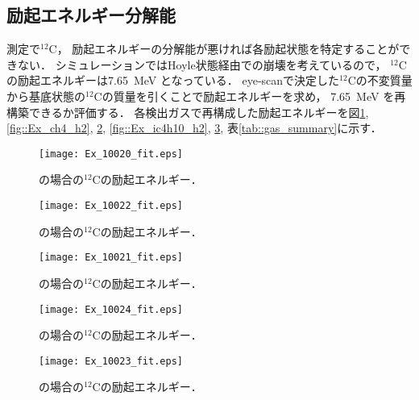 \documentclass[../master]{subfiles}
\begin{document}
\subsection{励起エネルギー分解能}
測定で${}^{12}\mathrm{C}$，
励起エネルギーの分解能が悪ければ各励起状態を特定することができない．
シミュレーションではHoyle状態経由での崩壊を考えているので，
${}^{12}\mathrm{C}$の励起エネルギーは\SI{7.65}{\mega\electronvolt} となっている．
eye-scanで決定した${}^{12}\mathrm{C}$の不変質量から基底状態の${}^{12}\mathrm{C}$の質量を引くことで励起エネルギーを求め，
\SI{7.65}{\mega\electronvolt} を再構築できるか評価する．
各検出ガスで再構成した励起エネルギーを図\ref{fig::Ex_ch4}, \ref{fig::Ex_ch4_h2}, \ref{fig::Ex_ch4_he},
\ref{fig::Ex_ic4h10_h2}, \ref{fig::Ex_ic4h10_he}, 表\ref{tab::gas_summary}に示す．
\begin{figure}
  \centering
  \begin{minipage}{0.45\columnwidth}
    \centering
    \texttt{[image: Ex\_10020\_fit.eps]}
    \caption{\Methane の場合の${}^{12}\mathrm{C}$の励起エネルギー．}
    \label{fig::Ex_ch4}
  \end{minipage}
\end{figure}
\begin{figure}
  \centering
  \begin{minipage}{0.45\columnwidth}
    \centering
    \texttt{[image: Ex\_10022\_fit.eps]}
    \caption{\MethaneHydro の場合の${}^{12}\mathrm{C}$の励起エネルギー．}
    \label{fig::Ex_ch4_h2}
  \end{minipage}
  \begin{minipage}{0.45\columnwidth}
    \centering
    \texttt{[image: Ex\_10021\_fit.eps]}
    \caption{\MethaneHerium の場合の${}^{12}\mathrm{C}$の励起エネルギー．}
    \label{fig::Ex_ch4_he}
  \end{minipage}
\end{figure}
\begin{figure}
  \centering
  \begin{minipage}{0.45\columnwidth}
    \centering
    \texttt{[image: Ex\_10024\_fit.eps]}
    \caption{\isoButaneHydro の場合の${}^{12}\mathrm{C}$の励起エネルギー．}
    \label{fig::Ex_ic4h10_h2}
  \end{minipage}
  \begin{minipage}{0.45\columnwidth}
    \centering
    \texttt{[image: Ex\_10023\_fit.eps]}
    \caption{\isoButaneHerium の場合の${}^{12}\mathrm{C}$の励起エネルギー．}
    \label{fig::Ex_ic4h10_he}
  \end{minipage}
\end{figure}
\end{document}
